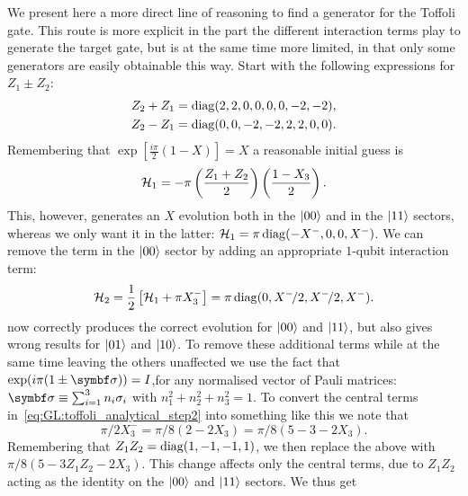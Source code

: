 We present here a more direct line of reasoning to find a generator for the Toffoli gate. This route is more explicit in the part the different interaction terms play to generate the target gate, but is at the same time more limited, in that only some generators are easily obtainable this way.
Start with the following expressions for $Z_1 \pm Z_2$:
\begin{equation}
\begin{aligned}
	Z_2 + Z_1 &= \operatorname{diag}(2, 2, 0, 0, 0, 0, -2, -2), \\
	Z_2 - Z_1 &= \operatorname{diag}(0, 0, -2, -2, 2, 2, 0, 0).
\end{aligned}
\end{equation}
Remembering that
$\exp\left[\frac{i\pi}{2}(1-X)\right] = X$ a reasonable initial guess is
\begin{equation}
	{\mathcal{H}}_1 = - \pi \left(\frac{Z_1+Z_2}{2}\right)\left(\frac{1-X_3}{2}\right).
\end{equation}
This, however, generates an $X$ evolution both in the $\ket{00}$ and in the $\ket{11}$ sectors, whereas we only want it in the latter:
${\mathcal{H}}_1 = \pi\operatorname{diag}(-X^-, 0, 0, X^-)$.
We can remove the term in the $\ket{00}$ sector by adding an appropriate $1$-qubit interaction term:
\begin{equation}
	{\mathcal{H}}_2 = \frac{1}{2} \left[ {\mathcal{H}}_1 + \pi X_3^- \right] =
    \pi \operatorname{diag}(0, X^-\!/2, X^-\!/2, X^-).
\label{eq:GL:toffoli_analytical_step2}
\end{equation}
 now correctly produces the correct evolution for $\ket{00}$ and $\ket{11}$, but also gives wrong results for $\ket{01}$ and $\ket{10}$.
To remove these additional terms while at the same time leaving the others unaffected we use the fact that $\exp(i\pi (1 \pm \bs{\sigma})) = I$,for any normalised vector of Pauli matrices: $\bs\sigma \equiv \sum_{i=1}^3 n_i \sigma_i$ with $n_1^2 + n_2^2 + n_3^2 = 1$.
To convert the central terms in~\cref{eq:GL:toffoli_analytical_step2} into something like this we note that
\begin{equation}
	\pi/2 X^-_3 = \pi/8(2 - 2 X_3) = \pi/8(5 - 3 - 2 X_3).
\end{equation}
Remembering that $Z_1 Z_2 = \operatorname{diag}(1, -1, -1, 1)$, we then replace the above with
$\pi/8(5 - 3Z_1 Z_2 - 2X_3)$.
This change affects only the central terms, due to $Z_1 Z_2$ acting as the identity on the $\ket{00}$ and $\ket{11}$ sectors. We thus get
